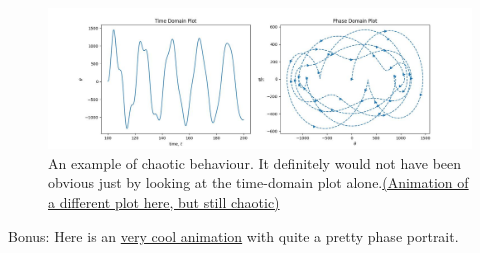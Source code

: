 \documentclass[10pt, twocolumn]{article}
\begin{document}
\begin{figure}[H]
    \centering
    \includegraphics[width = \columnwidth]{Projects/ForcedSimplePendulum/Plots/demo_chaos.jpg}
    \caption{An example of chaotic behaviour. It definitely would not have been obvious just by looking at the time-domain plot alone.\href{https://github.com/linsuong/PHYS-6017-Labs/blob/main/Projects/ForcedSimplePendulum/Plots/demo\%20chaos.gif}{(Animation of a different plot here, but still chaotic)}}
    \label{fig:enter-label}
\end{figure}
Bonus: Here is an \href{https://github.com/linsuong/PHYS-6017-Labs/blob/main/Projects/ForcedSimplePendulum/Plots/cool\%20plot\%20big\%20eta\%20low\%20k.gif}{very cool animation} with quite a pretty phase portrait.
\end{document}
